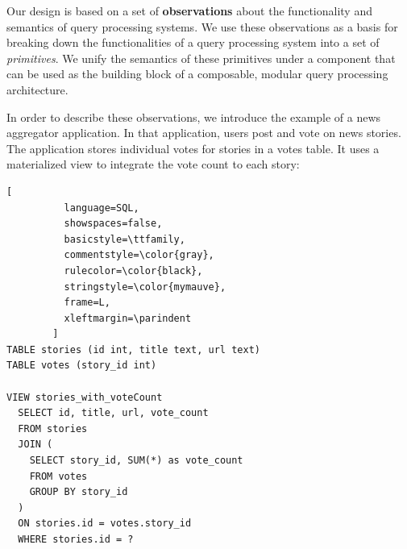 



\bigskip
\noindent
Our design is based on a set of \textbf{observations} about the functionality and semantics of query processing systems.
We use these observations as a basis for breaking down the functionalities of a query processing system into a
set of \textit{primitives}.
We unify the semantics of these primitives under a component that can be used as the building block
of a composable, modular query processing architecture.

In order to describe these observations, we introduce the example of a news aggregator application.
In that application, users post and vote on news stories.
The application stores individual votes for stories in a votes table.
It uses a materialized view to integrate the vote count to each story:

\begin{lstlisting}[
          language=SQL,
          showspaces=false,
          basicstyle=\ttfamily,
          commentstyle=\color{gray},
          rulecolor=\color{black},
          stringstyle=\color{mymauve},
          frame=L,
          xleftmargin=\parindent
        ]
TABLE stories (id int, title text, url text)
TABLE votes (story_id int)

VIEW stories_with_voteCount
  SELECT id, title, url, vote_count
  FROM stories
  JOIN (
    SELECT story_id, SUM(*) as vote_count
    FROM votes
    GROUP BY story_id
  )
  ON stories.id = votes.story_id
  WHERE stories.id = ?
\end{lstlisting}

